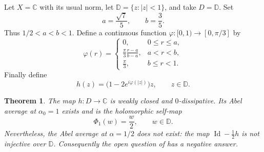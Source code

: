 \documentclass[11pt]{article}
\newtheorem{theorem}{Theorem}
\newcommand{\B}{\mathbb D}
\newcommand{\Id}{\operatorname{Id}}
\begin{document}
Let $X=\mathbb C$ with its usual norm, let $\B=\{z:|z|<1\}$, and take
$D=\B$.  Set
\[
  a=\frac{\sqrt7}{5},\qquad b=\frac35.
\]
Thus $1/2<a<b<1$.  Define a continuous function
$\varphi:[0,1)\to[0,\pi/3]$ by
\[
\varphi(r)=
\begin{cases}
0, & 0\le r\le a,\\[2mm]
\displaystyle \frac{\pi}{3}\frac{r-a}{b-a}, & a<r<b,\\[3mm]
\displaystyle \frac{\pi}{3}, & b\le r<1.
\end{cases}
\]
Finally define
\[
  h(z)=\bigl(1-2e^{i\varphi(|z|)}\bigr)z,\qquad z\in\B.
\]

\begin{theorem}
The map $h:D\to\mathbb C$ is weakly closed and $0$-dissipative.  Its Abel
average at $\alpha_0=1$ exists and is the holomorphic self-map
\[
  \Phi_1(w)=\frac{w}{2},\qquad w\in\B.
\]
Nevertheless, the Abel average at $\alpha=1/2$ does not exist: the map
$\Id-\tfrac12h$ is not injective over $\B$.  Consequently the open question
of \cite{BKS} has a negative answer.
\end{theorem}
\end{document}

